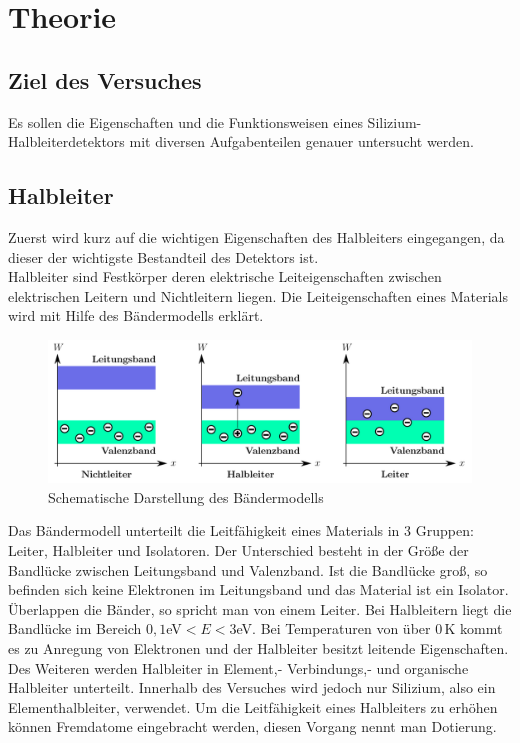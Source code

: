 \section{Theorie}
\label{sec:Theorie}
\subsection{Ziel des Versuches}
Es sollen die Eigenschaften und die Funktionsweisen eines Silizium-Halbleiterdetektors
mit diversen Aufgabenteilen genauer untersucht werden.

\subsection{Halbleiter}

Zuerst wird kurz auf die wichtigen Eigenschaften des Halbleiters eingegangen, da dieser
der wichtigste Bestandteil des Detektors ist. \\
Halbleiter sind Festkörper deren elektrische Leiteigenschaften zwischen elektrischen
Leitern und Nichtleitern liegen. Die Leiteigenschaften eines Materials wird mit
Hilfe des Bändermodells erklärt.

\begin{figure}[H]
  \centering
  \includegraphics[width=1\textwidth]{ressources/halbleiter.png}
  \caption{Schematische Darstellung des Bändermodells}
  \label{bänder }
\end{figure}
Das Bändermodell unterteilt die Leitfähigkeit eines Materials in 3 Gruppen:
Leiter, Halbleiter und Isolatoren. Der Unterschied besteht in der Größe
der Bandlücke zwischen Leitungsband und Valenzband. Ist die Bandlücke groß,
so befinden sich keine Elektronen im Leitungsband und das Material ist ein Isolator. Überlappen
die Bänder, so spricht man von einem Leiter.
 Bei Halbleitern liegt die Bandlücke im Bereich $0,1$eV$<E<3$eV. Bei Temperaturen von über $0\,$K kommt es zu
Anregung von Elektronen und der Halbleiter besitzt leitende Eigenschaften.
 Des Weiteren werden Halbleiter in Element,-
Verbindungs,- und organische Halbleiter unterteilt. Innerhalb des Versuches wird
jedoch nur Silizium, also ein Elementhalbleiter, verwendet. Um die Leitfähigkeit
eines Halbleiters zu erhöhen können Fremdatome eingebracht werden, diesen Vorgang nennt man
Dotierung.

